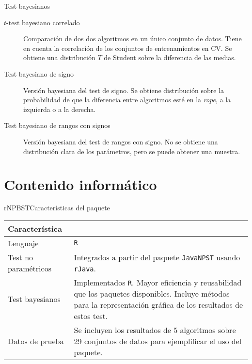 \documentclass[leqno]{beamer}
\theoremstyle{definition_wo_parentheses}
\begin{document}
\begin{frame}{Test bayesianos}
\begin{description}
\item[$t$-test bayesiano correlado] Comparación de dos
dos algoritmos en un único conjunto de datos. Tiene en cuenta
la correlación de los conjuntos de entrenamientos en CV.
Se obtiene una distribución $T$ de Student sobre la
diferencia de las medias.
\item[Test bayesiano de signo] Versión bayesiana del test de 
signo. Se obtiene distribución sobre la probabilidad de que 
la diferencia entre algoritmos esté en la \textit{rope}, a la 
izquierda o a la derecha.
\item[Test bayesiano de rangos con signos] Versión bayesiana 
del test de rangos con signo. No se obtiene una distribución clara de los parámetros, 
pero se puede obtener una muestra. 
\end{description}
\end{frame}


\section{Contenido informático}

\begin{frame}[fragile]{rNPBST}{Características del paquete}

\begin{table}[]
\begin{tabularx}{\textwidth}{lX}
\toprule
Característica &    \\
\midrule
Lenguaje             & \texttt{R}\\
Test no paramétricos & Integrados a partir del paquete \texttt{JavaNPST} usando \texttt{rJava}.\\
Test bayesianos      & Implementados \texttt{R}. Mayor eficiencia y reusabilidad que los paquetes disponibles. 
						Incluye métodos para la representación gráfica de los resultados de estos test. \\
Datos de prueba      & Se incluyen los resultados de 5 algoritmos sobre 29 conjuntos de datos para ejemplificar el uso del paquete.\\
\bottomrule
\end{tabularx}
\end{table}
\end{frame}
\end{document}
